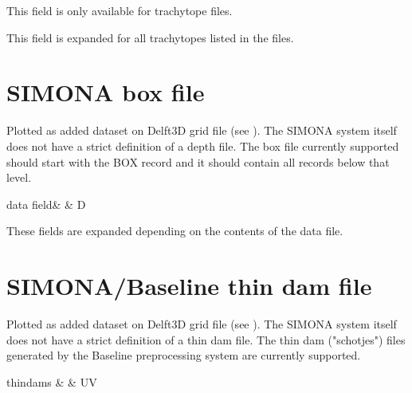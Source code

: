 \begin{enumerate_brackets}
\item This field is only available for trachytope  files.
\item This field is expanded for all trachytopes listed in the  files.
\end{enumerate_brackets}




\section{SIMONA box file} \label{Sec:FileBOX}

Plotted as added dataset on Delft3D grid file (see ).
The SIMONA system itself does not have a strict definition of a depth file.
The box file currently supported should start with the BOX record and it should contain all records below that level.

\begin{QUL-table}
\STRUT
data field\ENi & & D
\end{QUL-table}

\begin{enumerate_brackets}
\item These fields are expanded depending on the contents of the data file.
\end{enumerate_brackets}



\section{SIMONA/Baseline thin dam file} \label{Sec:FileSCHOT}

Plotted as added dataset on Delft3D grid file (see ). The SIMONA system itself does not have a strict definition of a thin dam file.
The thin dam ("schotjes") files generated by the Baseline preprocessing system are currently supported.

\begin{QUL-table}
\STRUT
thindams & & UV
\end{QUL-table}




